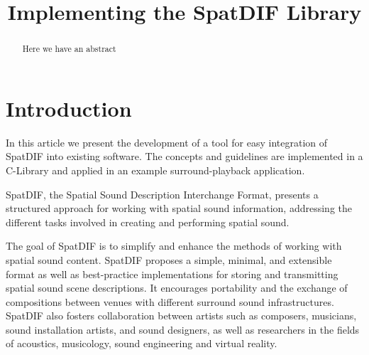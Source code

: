 \documentclass{article}
\title{Implementing the SpatDIF Library}
\begin{document}
%

\makeatletter 
\def\ps@myheadings{%
\let\ps@jpl@in\ps@plain%
\def\@evenhead{\reset@font\hfil\leftmark\hfil}%
\def\@oddhead{\reset@font\hfil\rightmark\hfil}%
\let\@mkboth\@gobbletwo%
\let\sectionmark\@gobble%
\let\subsectionmark\@gobble%
% 
\def\@oddfoot{\reset@font\hfil-- \thepage --\hfil}%
\let\@evenfoot\@oddfoot 
} 
\makeatother 
\setcounter{page}{17} 
\pagestyle{myheadings} 
\maketitle
\thispagestyle{myheadings}

\begin{abstract}

Here we have an abstract

\end{abstract}

\section{Introduction}

In this article we present the development of a tool for easy integration of SpatDIF into existing software.
The concepts and guidelines are implemented in a C-Library and applied in an example surround-playback application.

SpatDIF, the Spatial Sound Description Interchange Format, presents a structured approach for working with spatial sound information, addressing the different tasks involved in creating and performing spatial sound.

The goal of SpatDIF is to simplify and enhance the methods of working with spatial sound content. 
SpatDIF proposes a simple, minimal, and extensible format as well as best-practice implementations for storing and transmitting spatial sound scene descriptions. 
It encourages portability and the exchange of compositions between venues with different surround sound infrastructures. 
SpatDIF also fosters collaboration between artists such as composers, musicians, sound installation artists, and sound designers, as well as researchers in the fields of acoustics, musicology, sound engineering and virtual reality.
\end{document}
